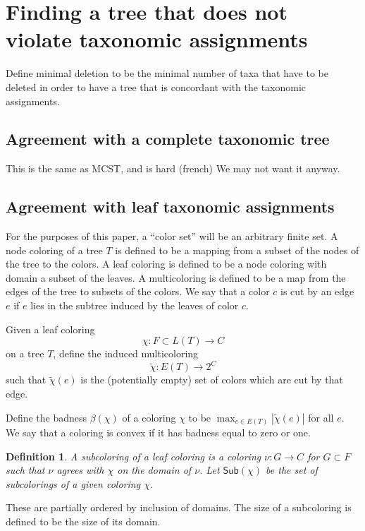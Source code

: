 \documentclass{amsart}
\newcommand{\col}{\chi}
\newcommand{\colt}{\tilde{\chi}}
\newcommand{\subcolS}{\mathsf{Sub}}
\newcommand{\bad}{\beta}
\newtheorem{defn}{Definition}
\begin{document}

\section{Finding a tree that does not violate taxonomic assignments}
Define minimal deletion to be the minimal number of taxa that have to be deleted in order to have a tree that is concordant with the taxonomic assignments.

\subsection{Agreement with a complete taxonomic tree}
This is the same as MCST, and is hard (french)
We may not want it anyway.

\subsection{Agreement with leaf taxonomic assignments}

For the purposes of this paper, a ``color set'' will be an arbitrary finite set.
A node coloring of a tree $T$ is defined to be a mapping from a subset of the nodes of the tree to the colors.
A leaf coloring is defined to be a node coloring with domain a subset of the leaves.
A multicoloring is defined to be a map from the edges of the tree to subsets of the colors.
We say that a color $c$ is cut by an edge $e$ if $e$ lies in the subtree induced by the leaves of color $c$.

Given a leaf coloring
\[
\col: F \subset L(T) \rightarrow C
\]
on a tree $T$, define the induced multicoloring
\[
\colt: E(T) \rightarrow 2^C
\]
such that $\colt(e)$ is the (potentially empty) set of colors which are cut by that edge.

Define the badness $\bad(\col)$ of a coloring $\col$ to be $\max_{e \in E(T)} |\colt(e)| $ for all $e$.
We say that a coloring is convex if it has badness equal to zero or one.

\begin{defn}
  A subcoloring of a leaf coloring is a coloring $\nu: G \rightarrow C$ for $G \subset F$ such that $\nu$ agrees with $\col$ on the domain of $\nu$.
  Let $\subcolS(\col)$ be the set of subcolorings of a given coloring $\col$.
\end{defn}
These are partially ordered by inclusion of domains.
The size of a subcoloring is defined to be the size of its domain.
\end{document}

